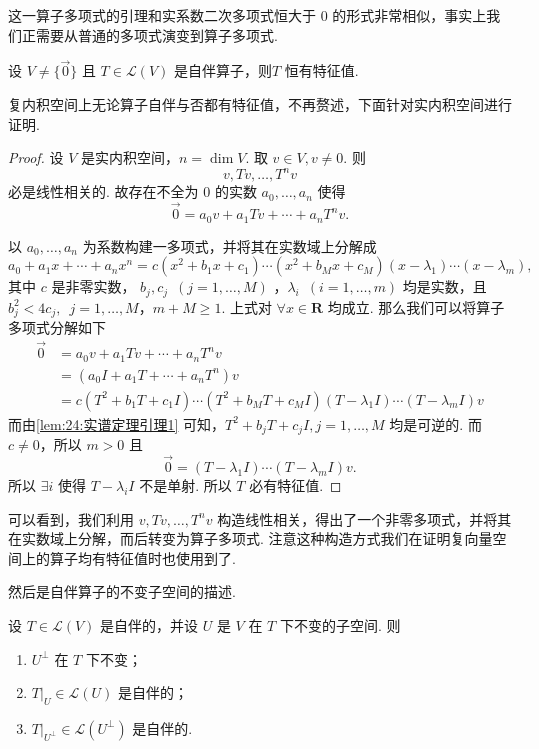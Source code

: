 这一算子多项式的引理和实系数二次多项式恒大于 0 的形式非常相似，事实上我们正需要从普通的多项式演变到算子多项式.

\begin{lemma} \label{lem:24:实谱定理引理2}
    设 $ V \neq \{ \vec{0} \} $ 且 $ T \in \mathcal{L}(V) $ 是自伴算子，则$ T $ 恒有特征值.
\end{lemma}

复内积空间上无论算子自伴与否都有特征值，不再赘述，下面针对实内积空间进行证明.

\begin{proof}
    设 $ V $ 是实内积空间，$ n = \dim V $. 取 $ v \in V, v \neq 0 $. 则
    \[ v, Tv, \ldots , T^nv \]
    必是线性相关的. 故存在不全为 0 的实数 $ a_0, \ldots , a_n $ 使得
    \[ \vec{0} = a_0v + a_1Tv + \cdots + a_nT^nv. \]

    以 $ a_0, \ldots , a_n $ 为系数构建一多项式，并将其在实数域上分解成
    \[ a_0 + a_1x + \cdots + a_nx^n  = c(x^2 + b_1x + c_1)\cdots(x^2 + b_Mx + c_M)(x - \lambda_1)\cdots(x - \lambda_m), \]
    其中 $ c $ 是非零实数， $ b_j, c_j \enspace(j = 1, \ldots , M) $ ，$ \lambda_i \enspace(i = 1, \ldots , m) $ 均是实数，且 $ b_j^2 < 4c_j ,\enspace j = 1, \ldots , M $，$ m + M \geqslant 1 $. 上式对 $ \forall x \in \mathbf{R} $ 均成立. 那么我们可以将算子多项式分解如下
    \begin{align*}
        \vec{0} & = a_0v + a_1Tv + \cdots + a_nT^nv                                                      \\
                & = (a_0I + a_1T + \cdots + a_nT^n)v                                                     \\
                & = c(T^2 + b_1T + c_1I)\cdots(T^2 + b_MT + c_MI)(T - \lambda_1I)\cdots(T - \lambda_mI)v
    \end{align*}
    而由\autoref{lem:24:实谱定理引理1} 可知，$ T^2 + b_jT + c_jI, j = 1, \ldots , M $ 均是可逆的. 而 $ c \neq 0 $，所以 $ m > 0 $ 且
    \[ \vec{0} = (T - \lambda_1I)\cdots(T - \lambda_mI)v. \]
    所以 $ \exists i $ 使得 $ T - \lambda_iI $ 不是单射. 所以 $ T $ 必有特征值.
\end{proof}

可以看到，我们利用 $ v, Tv, \ldots , T^nv $ 构造线性相关，得出了一个非零多项式，并将其在实数域上分解，而后转变为算子多项式. 注意这种构造方式我们在证明复向量空间上的算子均有特征值时也使用到了.

然后是自伴算子的不变子空间的描述.

\begin{lemma} \label{lem:24:实谱定理引理3}
    设 $ T \in \mathcal{L}(V) $ 是自伴的，并设 $ U $ 是 $ V $ 在 $ T $ 下不变的子空间. 则
    \begin{enumerate}
        \item $ U^{\perp} $ 在 $ T $ 下不变；

        \item $ T|_U \in \mathcal{L}(U) $ 是自伴的；

        \item $ T|_{U^{\perp }} \in \mathcal{L}(U^{\perp }) $ 是自伴的.
    \end{enumerate}
\end{lemma}

